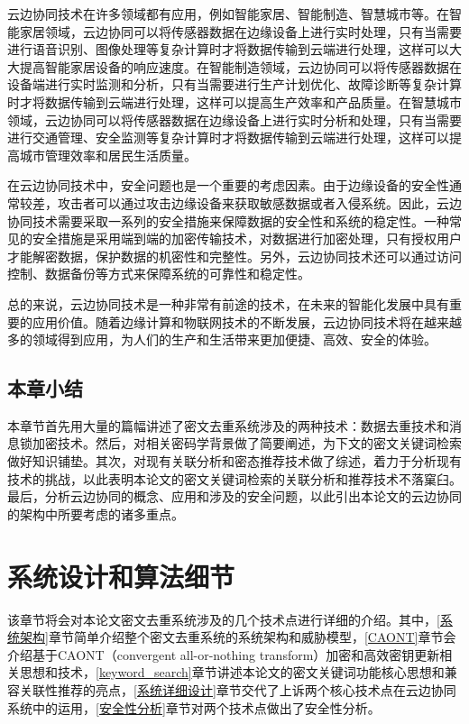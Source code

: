 \documentclass[promaster]{thesis-uestc}
\begin{document}
云边协同技术在许多领域都有应用，例如智能家居、智能制造、智慧城市等。在智能家居领域，云边协同可以将传感器数据在边缘设备上进行实时处理，只有当需要进行语音识别、图像处理等复杂计算时才将数据传输到云端进行处理，这样可以大大提高智能家居设备的响应速度。在智能制造领域，云边协同可以将传感器数据在设备端进行实时监测和分析，只有当需要进行生产计划优化、故障诊断等复杂计算时才将数据传输到云端进行处理，这样可以提高生产效率和产品质量。在智慧城市领域，云边协同可以将传感器数据在边缘设备上进行实时分析和处理，只有当需要进行交通管理、安全监测等复杂计算时才将数据传输到云端进行处理，这样可以提高城市管理效率和居民生活质量。

在云边协同技术中，安全问题也是一个重要的考虑因素。由于边缘设备的安全性通常较差，攻击者可以通过攻击边缘设备来获取敏感数据或者入侵系统。因此，云边协同技术需要采取一系列的安全措施来保障数据的安全性和系统的稳定性。一种常见的安全措施是采用端到端的加密传输技术，对数据进行加密处理，只有授权用户才能解密数据，保护数据的机密性和完整性。另外，云边协同技术还可以通过访问控制、数据备份等方式来保障系统的可靠性和稳定性。

总的来说，云边协同技术是一种非常有前途的技术，在未来的智能化发展中具有重要的应用价值。随着边缘计算和物联网技术的不断发展，云边协同技术将在越来越多的领域得到应用，为人们的生产和生活带来更加便捷、高效、安全的体验。

\section{本章小结}
本章节首先用大量的篇幅讲述了密文去重系统涉及的两种技术：数据去重技术和消息锁加密技术。然后，对相关密码学背景做了简要阐述，为下文的密文关键词检索做好知识铺垫。其次，对现有关联分析和密态推荐技术做了综述，着力于分析现有技术的挑战，以此表明本论文的密文关键词检索的关联分析和推荐技术不落窠臼。最后，分析云边协同的概念、应用和涉及的安全问题，以此引出本论文的云边协同的架构中所要考虑的诸多重点。

\chapter{系统设计和算法细节}\label{系统设计和技术细节}
该章节将会对本论文密文去重系统涉及的几个技术点进行详细的介绍。其中，\ref{系统架构}章节简单介绍整个密文去重系统的系统架构和威胁模型，\ref{CAONT}章节会介绍基于CAONT（convergent all-or-nothing transform）加密和高效密钥更新相关思想和技术，\ref{keyword_search}章节讲述本论文的密文关键词功能核心思想和兼容关联性推荐的亮点，\ref{系统详细设计}章节交代了上诉两个核心技术点在云边协同系统中的运用，\ref{安全性分析}章节对两个技术点做出了安全性分析。
\end{document}
